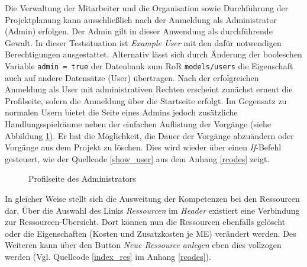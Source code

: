 \documentclass[a4paper,12pt,parskip,bibtotoc,liststotoc]{article}
\begin{document}
Die Verwaltung der Mitarbeiter und die Organisation sowie Durchführung der Projektplanung kann ausschließlich nach der Anmeldung als Administrator (Admin) erfolgen. Der Admin gilt in dieser Anwendung als durchführende Gewalt. In dieser Testsituation ist \textit{Example User} mit den dafür notwendigen Berechtigungen ausgestattet. Alternativ lässt sich durch Änderung der booleschen Variable \texttt{admin = true} der Datenbank zum RoR \texttt{models/users} die Eigenschaft auch auf andere Datensätze (User) übertragen. Nach der erfolgreichen Anmeldung als User mit administrativen Rechten erscheint zunächst erneut die Profilseite, sofern die Anmeldung über die Startseite erfolgt. Im Gegensatz zu normalen Usern bietet die Seite eines Admins jedoch zusätzliche Handlungsspielräume neben der einfachen Auflistung der Vorgänge (siehe Abbildung \ref{ProAd}). Er hat die Möglichkeit, die Dauer der Vorgänge abzuändern oder Vorgänge aus dem Projekt zu löschen. Dies wird wieder über einen \textit{If}-Befehl gesteuert, wie der Quellcode \ref{show_user} aus dem Anhang \ref{rcodes} zeigt.\\ 

\begin{figure}[h!]
  \begin{center}
    \caption{Profilseite des Administrators}  \label{ProAd}
  \end{center}
\end{figure}       

In gleicher Weise stellt sich die Ausweitung der Kompetenzen bei den Ressourcen dar. Über die Auswahl des Links \textit{Ressourcen} im \textit{Header} existiert eine Verbindung zur Ressourcen-Übersicht. Dort können nun die Ressourcen ebenfalls gelöscht oder die Eigenschaften (Kosten und Zusatzkosten je ME) verändert werden. Des Weiteren kann über den Button \textit{Neue Ressource anlegen} eben dies vollzogen werden (Vgl. Quellcode \ref{index_res} im Anhang \ref{rcodes}).\\      
\end{document}
